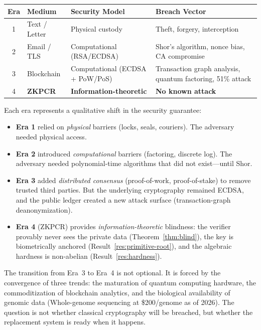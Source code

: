 \documentclass[12pt,a4paper]{article}
\begin{document}
\begin{center}
\small
\begin{tabular}{@{}clp{3.5cm}p{3.5cm}@{}}
\toprule
\textbf{Era} & \textbf{Medium} & \textbf{Security Model} & \textbf{Breach Vector} \\
\midrule
1 & Text / Letter & Physical custody & Theft, forgery, interception \\
2 & Email / TLS & Computational (RSA/ECDSA) & Shor's algorithm, nonce bias, CA compromise \\
3 & Blockchain & Computational (ECDSA + PoW/PoS) & Transaction graph analysis, quantum factoring, 51\% attack \\
4 & \textbf{ZKPCR} & \textbf{Information-theoretic} & \textbf{No known attack} \\
\bottomrule
\end{tabular}
\end{center}

Each era represents a qualitative shift in the security guarantee:
\begin{itemize}[noitemsep]
\item \textbf{Era 1} relied on \emph{physical} barriers (locks, seals, couriers). The adversary needed physical access.
\item \textbf{Era 2} introduced \emph{computational} barriers (factoring, discrete log). The adversary needed polynomial-time algorithms that did not exist---until Shor.
\item \textbf{Era 3} added \emph{distributed consensus} (proof-of-work, proof-of-stake) to remove trusted third parties. But the underlying cryptography remained ECDSA, and the public ledger created a new attack surface (transaction-graph deanonymization).
\item \textbf{Era 4} (ZKPCR) provides \emph{information-theoretic} blindness: the verifier provably never sees the private data (Theorem~\ref{thm:blind}), the key is biometrically anchored (Result~\ref{res:primitive-root}), and the algebraic hardness is non-abelian (Result~\ref{res:hardness}).
\end{itemize}

The transition from Era~3 to Era~4 is not optional. It is forced by the convergence of three trends: the maturation of quantum computing hardware, the commoditization of blockchain analytics, and the biological availability of genomic data (Whole-genome sequencing at \$200/genome as of 2026). The question is not whether classical cryptography will be breached, but whether the replacement system is ready when it happens.
\end{document}
